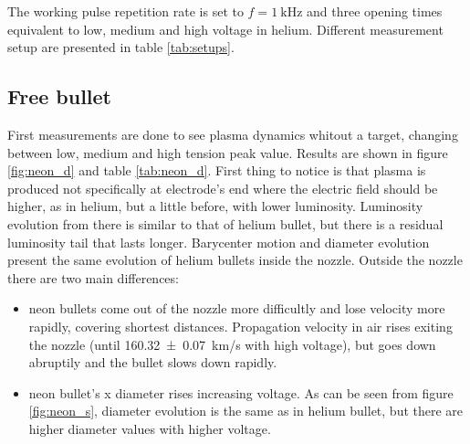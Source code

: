 The working pulse repetition rate is set to $f = \SI{1}{\kilo\hertz}$ and three opening times equivalent to low, medium and high voltage in helium. Different measurement setup are presented in table \ref{tab:setups}.

\subsection{Free bullet}
First measurements are done to see plasma dynamics whitout a target, changing between low, medium and high tension peak value. Results are shown in figure \ref{fig:neon_d} and table \ref{tab:neon_d}.
First thing to notice is that plasma is produced not specifically at electrode's end where the electric field should be higher, as in helium, but a little before, with lower luminosity. Luminosity evolution from there is similar to that of helium bullet, but there is a residual luminosity tail that lasts longer.
Barycenter motion and diameter evolution present the same evolution of helium bullets inside the nozzle. Outside the nozzle there are two main differences:
\begin{itemize}
 \item neon bullets come out of the nozzle more difficultly and lose velocity more rapidly, covering shortest distances. Propagation velocity in air rises exiting the nozzle (until \SI{160.32(7)}{\kilo\meter/\second} with high voltage), but goes down abruptily and the bullet slows down rapidly.
 \item neon bullet's x diameter rises increasing voltage. As can be seen from figure \ref{fig:neon_s}, diameter evolution is the same as in helium bullet, but there are higher diameter values with higher voltage.
\end{itemize}


